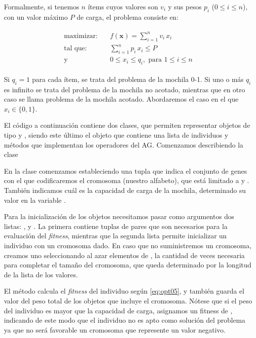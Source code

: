 Formalmente, si tenemos $n$ ítems cuyos valores son $v_i$ y sus pesos $p_i$ ($0 \leq i \leq n$), con un valor máximo $P$ de carga, el problema consiste en:

\begin{align}
 \begin{split}
 \text{maximizar:}& \quad f(\bm{x}) = \sum_{i=1}^n v_i \, x_i \\
 \text{tal que:}& \quad \sum_{i=1}^{n} p_i \, x_i \leq P \\
 \text{y} & \quad  0 \leq x_i \leq q_i, \text{ para } 1 \leq i \leq n 
 \end{split}
 \label{eq:opt05}
\end{align}

Si $q_i = 1$ para cada ítem, se trata del problema de la mochila 0-1. Si uno o más $q_i$ es infinito se trata del problema de la mochila no acotado, mientras que en otro caso se llama problema de la mochila acotado. Abordaremos el caso en el que $x_i \in \{0, 1\}$.

El código a continuación contiene dos clases, que permiten representar objetos de tipo  y , siendo este último el objeto que contiene una lista de individuos y métodos que implementan los operadores del AG. Comenzamos describiendo la clase 


En la clase  comenzamos estableciendo una tupla que indica el conjunto de genes con el que codificaremos el cromosoma (nuestro alfabeto), que está limitado a  y . También indicamos cuál es la capacidad de carga de la mochila, determinado su valor en la variable . 

Para la inicialización de los objetos necesitamos pasar como argumentos dos listas: , y . La primera contiene tuplas de pares  que son necesarios para la evaluación del \textit{fitness}, mientras que la segunda lista permite inicializar un individuo con un cromosoma dado. En caso que no suministremos un cromosoma, creamos uno seleccionando al azar elementos de , la cantidad de veces necesaria para completar el tamaño del cromosoma, que queda determinado por la longitud de la lista de los valores.

El método  calcula el \textit{fitness} del individuo según \eqref{eq:opt05}, y también guarda el valor del peso total de los objetos que incluye el cromosoma. Nótese que si el peso del individuo es mayor que la capacidad de carga, asignamos un fitness de , indicando de este modo que el individuo no es apto como solución del problema ya que no será favorable un cromosoma que represente un valor negativo.

